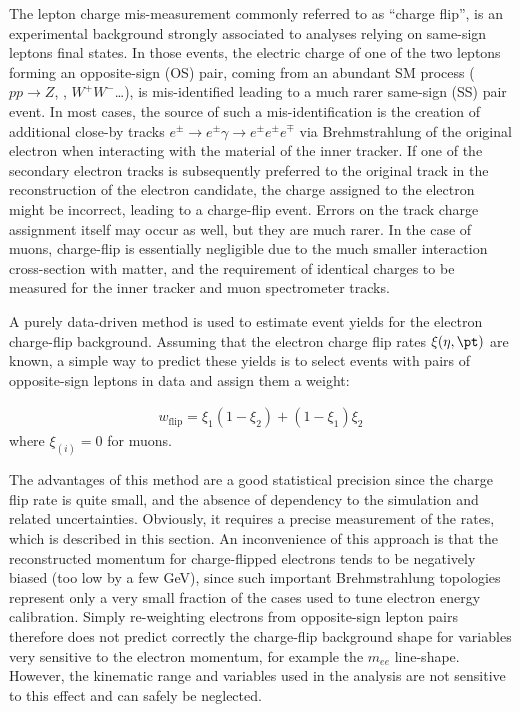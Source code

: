 The lepton charge mis-measurement commonly referred to as ``charge flip'', 
is an experimental background strongly associated to analyses relying on same-sign leptons final states. 
In those events, the electric charge of one of the two leptons forming an opposite-sign (OS) pair, 
coming from an abundant SM process ($pp\to Z$, \ttbar, $W^+W^-$\ldots), 
is mis-identified leading to a much rarer same-sign (SS) pair event.
In most cases, the source of such a mis-identification 
is the creation of additional close-by tracks $e^\pm\to e^\pm\gamma\to e^\pm e^\pm e^\mp$ 
via Brehmstrahlung of the original electron when interacting with the material of the inner tracker. 
If one of the secondary electron tracks is subsequently preferred to the original track in the reconstruction of the electron candidate, 
the charge assigned to the electron might be incorrect, leading to a charge-flip event. 
Errors on the track charge assignment itself may occur as well, but they are much rarer. 
In the case of muons, charge-flip is essentially negligible due to the much smaller interaction cross-section with matter, 
and the requirement of identical charges to be measured for the inner tracker and muon spectrometer tracks. 

A purely data-driven method is used to estimate event yields for the 
electron charge-flip background. 
Assuming that the electron charge flip rates $\xi(\eta,\pt)$ are known, 
a simple way to predict these yields is to select events with pairs of opposite-sign leptons in data and assign them a weight:

\begin{align}
w_\text{flip} = \xi_1(1-\xi_2) + (1-\xi_1)\xi_2
\label{eqn:chargeflip_weight}
\end{align}
where $\xi_{(i)}=0$ for muons.

The advantages of this method are a good statistical precision since the charge flip rate is quite small, 
and the absence of dependency to the simulation and related uncertainties. 
Obviously, it requires a precise measurement of the rates, which is described in this section. 
An inconvenience of this approach is that the reconstructed momentum for charge-flipped electrons  
tends to be negatively biased (too low by a few GeV), 
since such important Brehmstrahlung topologies represent only 
a very small fraction of the cases used to tune electron energy calibration. 
Simply re-weighting electrons from opposite-sign lepton pairs therefore does not predict correctly 
the charge-flip background shape for variables very sensitive to the electron momentum, for example the $m_{ee}$ line-shape. 
However, the kinematic range and variables used in the analysis are not
sensitive to this effect and can safely be neglected.

